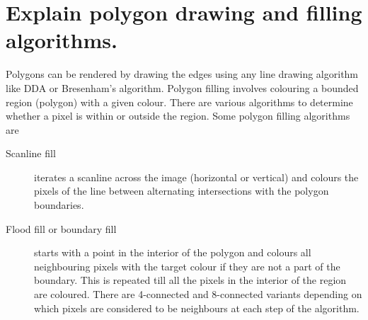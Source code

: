 \documentclass[a4paper,14pt,english,crop=false]{standalone}
\begin{document}
\section{Explain polygon drawing and filling algorithms.}
Polygons can be rendered by drawing the edges using any line drawing algorithm
like DDA or Bresenham's algorithm.
Polygon filling involves colouring a bounded region (polygon) with a given
colour. There are various algorithms to determine whether a pixel is within or
outside the region.
Some polygon filling algorithms are
\begin{description}
  \item [Scanline fill] {iterates a scanline across the image (horizontal or
      vertical) and colours the pixels of the line between alternating
      intersections with the polygon boundaries.}
  \item [Flood fill or boundary fill] {starts with a point in the interior of
      the polygon and colours all neighbouring pixels with the target colour if
      they are not a part of the boundary. This is repeated till all the pixels
      in the interior of the region are coloured. There are 4-connected and
      8-connected variants depending on which pixels are considered to be
      neighbours at each step of the algorithm.}
\end{description}
\end{document}
